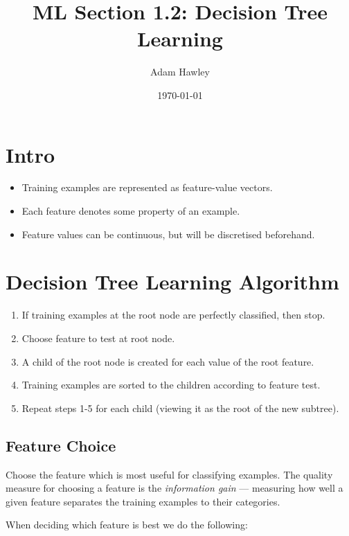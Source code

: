 \documentclass[11pt]{article}
\author{Adam Hawley}
\date{\today}
\title{ML Section 1.2: Decision Tree Learning}
\begin{document}
\maketitle
\tableofcontents


\section{Intro}
\label{sec:org1083861}
\begin{itemize}
\item Training examples are represented as feature-value vectors.
\item Each feature denotes some property of an example.
\item Feature values can be continuous, but will be discretised beforehand.
\end{itemize}

\section{Decision Tree Learning Algorithm}
\label{sec:orgddb84e6}
\begin{enumerate}
\item If training examples at the root node are perfectly classified, then stop.
\item Choose feature to test at root node.
\item A child of the root node is created for each value of the root feature.
\item Training examples are sorted to the children according to feature test.
\item Repeat steps 1-5 for each child (viewing it as the root of the new subtree).
\end{enumerate}

\subsection{Feature Choice}
\label{sec:orgab22f61}
Choose the feature which is most useful for classifying examples.
The quality measure for choosing a feature is the \emph{information gain} --- measuring how well a given feature separates the training examples to their categories.

When deciding which feature is best we do the following:
\end{document}
